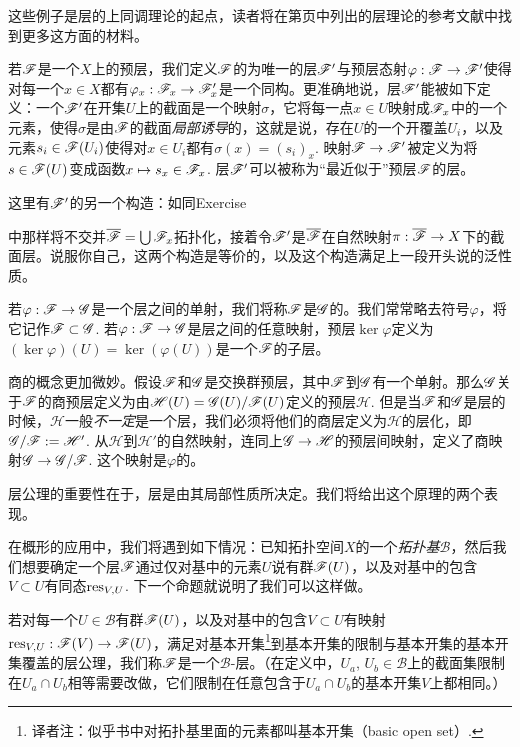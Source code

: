 这些例子是层的上同调理论的起点，读者将在第\pageref{ref:1}页中列出的层理论的参考文献中找到更多这方面的材料。

若$\mathscr{F}$是一个$X$上的预层，我们定义$\mathscr{F}$的为唯一的层$\mathscr{F}'$与预层态射$\varphi:\mathscr{F}\to\mathscr{F}'$使得对每一个$x\in X$都有$\varphi_x:\mathscr{F}_x\to\mathscr{F}'_x$是一个同构。更准确地说，层$\mathscr{F}'$能被如下定义：一个$\mathscr{F}'$在开集$U$上的截面是一个映射$\sigma$，它将每一点$x\in U$映射成$\mathscr{F}_x$中的一个元素，使得$\sigma$是由$\mathscr{F}$的截面\textit{局部诱导}的，这就是说，存在$U$的一个开覆盖$U_i$，以及元素$s_i\in \mathscr{F}(U_i)$使得对$x\in U_i$都有$\sigma(x)=(s_i)_x$. 映射$\mathscr{F}\to\mathscr{F}'$被定义为将$s\in\mathscr{F}(U)$变成函数$x\mapsto s_x\in\mathscr{F}_x$. 层$\mathscr{F}'$可以被称为“最近似于”预层$\mathscr{F}$的层。

\begin{exe}
	这里有$\mathscr{F}'$的另一个构造：如同Exercise {{\addtocounter{thm}{-3}}\thethm{\addtocounter{thm}{3}}}中那样将不交并$\overline{\mathscr{F}}=\bigcup \mathscr{F}_x$拓扑化，接着令$\mathscr{F}'$是$\overline{\mathscr{F}}$在自然映射$\pi:\overline{\mathscr{F}}\to X$下的截面层。说服你自己，这两个构造是等价的，以及这个构造满足上一段开头说的泛性质。
\end{exe}

若$\varphi:\mathscr{F}\to\mathscr{G}$是一个层之间的单射，我们将称$\mathscr{F}$是$\mathscr{G}$的。我们常常略去符号$\varphi$，将它记作$\mathscr{F}\subset \mathscr{G}$. 若$\varphi:\mathscr{F}\to\mathscr{G}$是层之间的任意映射，预层$\ker\varphi$定义为$(\ker\varphi)(U)=\ker(\varphi(U))$是一个$\mathscr{F}$的子层。

商的概念更加微妙。假设$\mathscr{F}$和$\mathscr{G}$是交换群预层，其中$\mathscr{F}$到$\mathscr{G}$有一个单射。那么$\mathscr{G}$关于$\mathscr{F}$的商预层定义为由$\mathscr{H}(U)=\mathscr{G}(U)/\mathscr{F}(U)$定义的预层$\mathscr{H}$. 但是当$\mathscr{F}$和$\mathscr{G}$是层的时候，$\mathscr{H}$一般\textit{不一定}是一个层，我们必须将他们的商层定义为$\mathscr{H}$的层化，即$\mathscr{G}/\mathscr{F}:=\mathscr{H}'$. 从$\mathscr{H}$到$\mathscr{H}'$的自然映射，连同上$\mathscr{G}\to \mathscr{H}$的预层间映射，定义了商映射$\mathscr{G}\to \mathscr{G}/\mathscr{F}$. 这个映射是$\varphi$的。

层公理的重要性在于，层是由其局部性质所决定。我们将给出这个原理的两个表现。

在概形的应用中，我们将遇到如下情况：已知拓扑空间$X$的一个\textit{拓扑基}$\mathscr{B}$，然后我们想要确定一个层$\mathscr{F}$通过仅对基中的元素$U$说有群$\mathscr{F}(U)$，以及对基中的包含$V\subset U$有同态$\operatorname{res}_{V,U}$. 下一个命题就说明了我们可以这样做。

若对每一个$U\in\mathscr{B}$有群$\mathscr{F}(U)$，以及对基中的包含$V\subset U$有映射$\operatorname{res}_{V,U}:\mathscr{F}(V)\to \mathscr{F}(U)$，满足对基本开集\footnote{译者注：似乎书中对拓扑基里面的元素都叫基本开集（basic open set）.}到基本开集的限制与基本开集的基本开集覆盖的层公理，我们称$\mathscr{F}$是一个$\mathscr{B}$\hyp 层。（在定义中，$U_a$, $U_b\in\mathscr{B}$上的截面集限制在$U_a\cap U_b$相等需要改做，它们限制在任意包含于$U_a\cap U_b$的基本开集$V$上都相同。）

